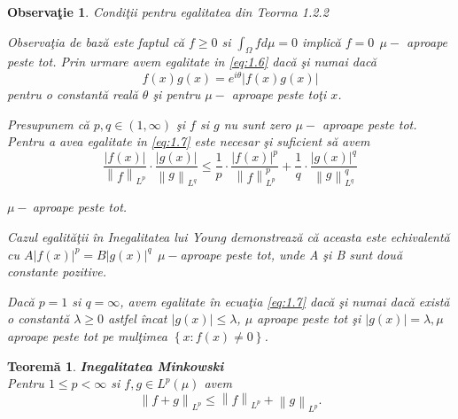 \documentclass[a4paper,12pt,oneside]{report}
\newtheorem{theorem}{Teorem\u a}
\newtheorem{remark}{Observa\c{t}ie}
\begin{document}
\begin{remark}

Condi\c{t}ii pentru egalitatea din Teorma 1.2.2

Observa\c{t}ia de baz\u{a} este faptul c\u{a}  \(f\geq 0\) si \(\int_{\Omega }f d\mu  = 0\) implic\u{a} \(f = 0~~ \mu-\) aproape peste tot.
	Prin urmare avem egalitate in \ref{eq:1.6} dac\u{a} \c{s}i numai dac\u{a}
\begin{displaymath}
  f\left ( x \right )g\left ( x \right ) = e^{i\theta }\left | f\left ( x \right ) g\left ( x \right )\right |
\end{displaymath}
pentru o constant\u{a} real\u{a} \(\theta\) \c{s}i pentru \(\mu-\) aproape peste to\c{t}i \(x\).


	Presupunem c\u{a} \(p , q \in \left ( 1 , \infty  \right )\) \c{s}i \(f\) si \(g\) nu sunt zero \(\mu-\) aproape peste tot. Pentru a avea egalitate in \ref{eq:1.7} este necesar \c{s}i suficient s\u{a} avem
\begin{displaymath}
  \frac{\left | f\left ( x \right ) \right |}{\left \| f \right \|_{L^{p}}} \cdot \frac{\left | g\left ( x \right ) \right |}{\left \| g \right \|_{L^{q}}}\leq \frac{1}{p}\cdot \frac{\left | f\left ( x \right ) \right |^{p}}{\left \| f \right \|^{p}_{L^{p}}} + \frac{1}{q}\cdot \frac{\left | g\left ( x \right ) \right |^{q}}{\left \| g \right \|^{q}_{L^{q}}}
\end{displaymath}

\(\mu-~\)aproape peste tot.

Cazul egalit\u{a}\c{t}ii \^{i}n Inegalitatea lui Young demonstreaz\u{a} c\u{a} aceasta este echivalent\u{a} cu \(A\left | f\left ( x \right ) \right |^{p} = B\left | g\left ( x \right ) \right |^{q}~~ \mu-\)aproape peste tot,
unde A \c{s}i B sunt dou\u{a} constante pozitive.

	Dac\u{a} \(p = 1\) si \(q = \infty\), avem egalitate \^{i}n ecua\c{t}ia \ref{eq:1.7} dac\u{a} \c{s}i numai dac\u{a} exist\u{a} o constant\u{a} \(\lambda \geq 0\) astfel \^{i}ncat \(\left | g\left ( x \right ) \right |\leq \lambda\),  \(\mu\) aproape peste tot \c{s}i \(\left | g\left ( x \right ) \right |= \lambda,  \mu\) aproape peste tot pe mul\c{t}imea \(\left \{ x : f\left ( x \right )\neq 0 \right \}\).
\end{remark}
\begin{theorem}
\textbf{Inegalitatea Minkowski}\\

Pentru \(1\leq  p < \infty\) si \(f , g \in L^{p}\left ( \mu  \right ) \) avem
\begin{displaymath}
  \left \| f + g  \right \|_{L^{p}}\leq \left \| f \right \|_{L^{p}} + \left \| g \right \|_{L^{p}}. \label{eq:1.10} \tag{1.10}
\end{displaymath}
\end{theorem}
\end{document}
